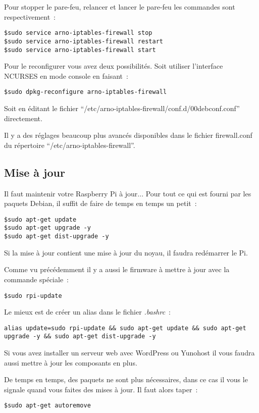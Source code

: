 Pour stopper le pare-feu, relancer et lancer le pare-feu les commandes sont respectivement~:
\begin{verbatim}
$sudo service arno-iptables-firewall stop
$sudo service arno-iptables-firewall restart
$sudo service arno-iptables-firewall start
\end{verbatim}

Pour le reconfigurer vous avez deux possibilités. Soit utiliser l'interface NCURSES en mode console en faisant~:
\begin{verbatim}
$sudo dpkg-reconfigure arno-iptables-firewall
\end{verbatim}

Soit en éditant le fichier ``/etc/arno-iptables-firewall/conf.d/00debconf.conf'' directement.

Il y a des réglages beaucoup plus avancés disponibles dans le fichier firewall.conf du répertoire ``/etc/arno-iptables-firewall''.

\subsection{Mise à jour}

Il faut maintenir votre Raspberry Pi à jour... Pour tout ce qui est fourni par les paquets Debian, il suffit de faire de temps en temps un petit~:
\begin{verbatim}
$sudo apt-get update
$sudo apt-get upgrade -y
$sudo apt-get dist-upgrade -y
\end{verbatim}

Si la mise à jour contient une mise à jour du noyau, il faudra redémarrer le Pi.

Comme vu précédemment il y a aussi le firmware à mettre à jour avec la commande spéciale~:
\begin{verbatim}
$sudo rpi-update
\end{verbatim}

Le mieux est de créer un alias dans le fichier \emph{.bashrc}~:
\begin{verbatim}
alias update=sudo rpi-update && sudo apt-get update && sudo apt-get upgrade -y && sudo apt-get dist-upgrade -y 
\end{verbatim}

Si vous avez installer un serveur web avec WordPress ou Yunohost il vous faudra aussi mettre à jour les composants en plus.

De temps en temps, des paquets ne sont plus nécessaires, dans ce cas il vous le signale quand vous faites des mises à jour. Il faut alors taper~:
\begin{verbatim}
$sudo apt-get autoremove
\end{verbatim}

